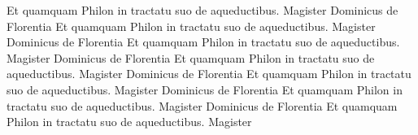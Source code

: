 \documentclass{book}
\begin{document}
\begin{pairs}
\begin{Leftside}
Et quamquam Philon in tractatu suo de aqueductibus. Magister Dominicus de Florentia
Et quamquam Philon in tractatu suo de aqueductibus. Magister Dominicus de Florentia
Et quamquam Philon in tractatu suo de aqueductibus. Magister Dominicus de Florentia
Et quamquam Philon in tractatu suo de aqueductibus. Magister Dominicus de Florentia
Et quamquam Philon in tractatu suo de aqueductibus. Magister Dominicus de Florentia
Et quamquam Philon in tractatu suo de aqueductibus. Magister Dominicus de Florentia
Et quamquam Philon in tractatu suo de aqueductibus. Magister 

\pend
\endnumbering
\end{Leftside}


\end{pairs}
\end{document}
